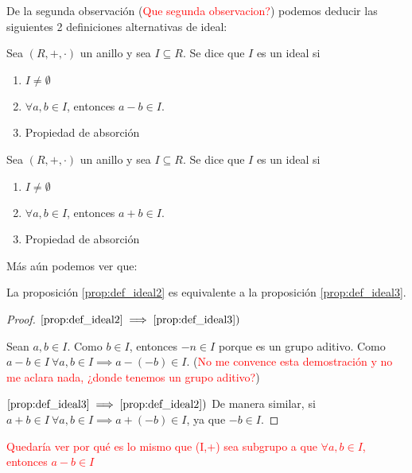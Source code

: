 De la segunda observación (\textcolor{red}{Que segunda observacion?}) podemos deducir las siguientes 2 definiciones alternativas de ideal:

\begin{prop}\label{prop:def_ideal2}
	Sea $(R,+,\cdot)$ un anillo y sea $I \subseteq R$. Se dice que $I$ es un ideal si

	\begin{enumerate}
		\item $I \neq \emptyset$
		\item $\forall a,b \in I$, entonces $a-b \in I$.
		\item Propiedad de absorción
	\end{enumerate}
\end{prop}
\begin{prop}\label{prop:def_ideal3}
	Sea $(R,+,\cdot)$ un anillo y sea $I \subseteq R$. Se dice que $I$ es un ideal si

	\begin{enumerate}
		\item $I \neq \emptyset$
		\item $\forall a,b \in I$, entonces $a+b \in I$.
		\item Propiedad de absorción
	\end{enumerate}
\end{prop}


Más aún podemos ver que:
\begin{prop}
	La proposición \ref{prop:def_ideal2} es equivalente a la proposición \ref{prop:def_ideal3}.
\end{prop}
\begin{proof}
	$\ref{prop:def_ideal2} \implies \ref{prop:def_ideal3})$

	Sean $a,b \in I$. Como $b \in I$, entonces $-n \in I$ porque es un grupo aditivo.
	Como $a-b \in I \ \forall a,b \in I \implies a-(-b) \in I$. (\textcolor{red}{No me convence esta demostración y no me aclara nada, ¿donde tenemos un grupo aditivo?})

	$\ref{prop:def_ideal3} \implies \ref{prop:def_ideal2})$
	De manera similar, si $a+b \in I \ \forall a,b \in I \implies a+(-b) \in I$, ya que $-b \in I$.
\end{proof}

\textcolor{red}{Quedaría ver por qué es lo mismo que (I,+) sea subgrupo a que $\forall a,b \in I$, entonces $a-b \in I$}

